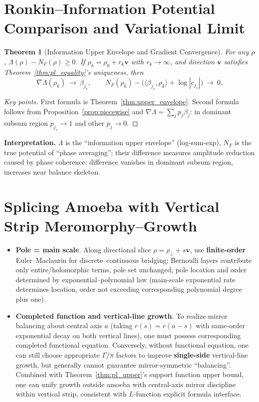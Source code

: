 \documentclass[11pt,a4paper]{article}
\newtheorem{theorem}{Theorem}[section]
\theoremstyle{remark}
\begin{document}
\section{Ronkin--Information Potential Comparison and Variational Limit}

\begin{theorem}[Information Upper Envelope and Gradient Convergence]\label{thm:info_limit}
For any $\rho$, $\Lambda(\rho)-N_F(\rho)\ge0$. If $\rho_k=\rho_0+r_k\mathbf{v}$ with $r_k\to\infty$, and direction $\mathbf{v}$ satisfies Theorem~\ref{thm:pl_equality}'s uniqueness, then
\begin{equation}
\nabla\Lambda(\rho_k)\ \to\ \beta_{j_\star},\qquad
N_F(\rho_k)-\bigl(\langle\beta_{j_\star},\rho_k\rangle+\log|c_{j_\star}|\bigr)\ \to\ 0 .
\end{equation}
\end{theorem}

\begin{proof}[Key points]
First formula is Theorem~\ref{thm:upper_envelope}. Second formula follows from Proposition~\ref{prop:piecewise} and $\nabla\Lambda=\sum_j p_j\beta_j$: in dominant subsum region $p_{j_\star}\to1$ and other $p_j\to0$.
\end{proof}

\textbf{Interpretation.} $\Lambda$ is the ``information upper envelope'' (log-sum-exp), $N_F$ is the true potential of ``phase averaging''; their difference measures amplitude reduction caused by phase coherence: difference vanishes in dominant subsum region, increases near balance skeleton.

\section{Splicing Amoeba with Vertical Strip Meromorphy--Growth}

\begin{itemize}
\item \textbf{Pole = main scale}. Along directional slice $\rho=\rho_\perp+s\mathbf{v}$, use \textbf{finite-order} Euler--Maclaurin for discrete--continuous bridging; Bernoulli layers contribute only entire/holomorphic terms, pole set unchanged; pole location and order determined by exponential--polynomial law (main-scale exponential rate determines location, order not exceeding corresponding polynomial degree plus one).

\item \textbf{Completed function and vertical-line growth}. To realize mirror balancing about central axis $a$ (taking $r(s)=r(a-s)$ with same-order exponential decay on both vertical lines), one must possess corresponding completed functional equation. Conversely, without functional equation, one can still choose appropriate $\Gamma/\pi$ factors to improve \textbf{single-side} vertical-line growth, but generally cannot guarantee mirror-symmetric ``balancing''. Combined with Theorem~\ref{thm:pl_upper}'s support function upper bound, one can unify growth outside amoeba with central-axis mirror discipline within vertical strip, consistent with $L$-function explicit formula interface.
\end{itemize}
\end{document}
